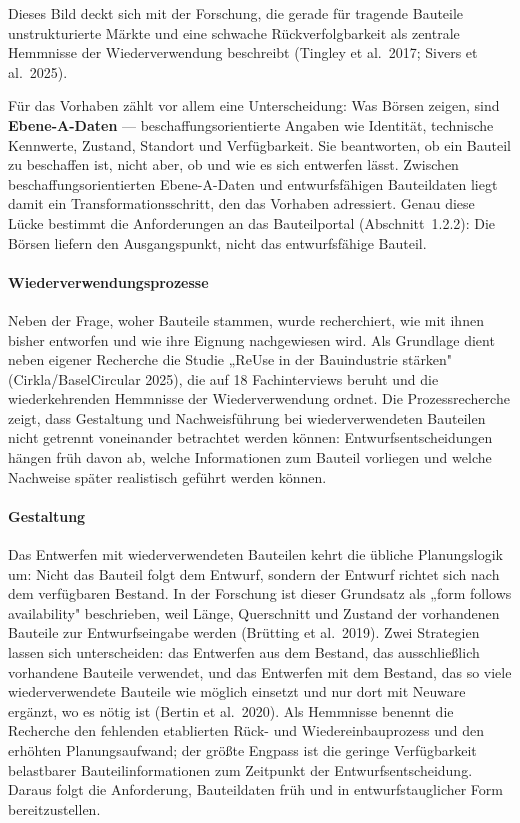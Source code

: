 \documentclass[type=zwischenbericht]{zukunftbau}
\begin{document}
\begin{SemioNest}
Dieses Bild deckt sich mit der Forschung, die gerade für tragende Bauteile unstrukturierte Märkte und eine schwache Rückverfolgbarkeit als zentrale Hemmnisse der Wiederverwendung beschreibt (Tingley et al.\ 2017; Sivers et al.\ 2025).

Für das Vorhaben zählt vor allem eine Unterscheidung: Was Börsen zeigen, sind \textbf{Ebene-A-Daten} --- beschaffungsorientierte Angaben wie Identität, technische Kennwerte, Zustand, Standort und Verfügbarkeit. Sie beantworten, ob ein Bauteil zu beschaffen ist, nicht aber, ob und wie es sich entwerfen lässt. Zwischen beschaffungsorientierten Ebene-A-Daten und entwurfsfähigen Bauteildaten liegt damit ein Transformationsschritt, den das Vorhaben adressiert. Genau diese Lücke bestimmt die Anforderungen an das Bauteilportal (Abschnitt~1.2.2): Die Börsen liefern den Ausgangspunkt, nicht das entwurfsfähige Bauteil.

\paragraph{Wiederverwendungsprozesse}
Neben der Frage, woher Bauteile stammen, wurde recherchiert, wie mit ihnen bisher entworfen und wie ihre Eignung nachgewiesen wird. Als Grundlage dient neben eigener Recherche die Studie „ReUse in der Bauindustrie stärken" (Cirkla/BaselCircular 2025), die auf 18 Fachinterviews beruht und die wiederkehrenden Hemmnisse der Wiederverwendung ordnet. Die Prozessrecherche zeigt, dass Gestaltung und Nachweisführung bei wiederverwendeten Bauteilen nicht getrennt voneinander betrachtet werden können: Entwurfsentscheidungen hängen früh davon ab, welche Informationen zum Bauteil vorliegen und welche Nachweise später realistisch geführt werden können.

\begin{SemioNest}
\paragraph{Gestaltung}
Das Entwerfen mit wiederverwendeten Bauteilen kehrt die übliche Planungslogik um: Nicht das Bauteil folgt dem Entwurf, sondern der Entwurf richtet sich nach dem verfügbaren Bestand. In der Forschung ist dieser Grundsatz als „form follows availability" beschrieben, weil Länge, Querschnitt und Zustand der vorhandenen Bauteile zur Entwurfseingabe werden (Brütting et al.\ 2019). Zwei Strategien lassen sich unterscheiden: das Entwerfen aus dem Bestand, das ausschließlich vorhandene Bauteile verwendet, und das Entwerfen mit dem Bestand, das so viele wiederverwendete Bauteile wie möglich einsetzt und nur dort mit Neuware ergänzt, wo es nötig ist (Bertin et al.\ 2020). Als Hemmnisse benennt die Recherche den fehlenden etablierten Rück- und Wiedereinbauprozess und den erhöhten Planungsaufwand; der größte Engpass ist die geringe Verfügbarkeit belastbarer Bauteilinformationen zum Zeitpunkt der Entwurfsentscheidung. Daraus folgt die Anforderung, Bauteildaten früh und in entwurfstauglicher Form bereitzustellen.


\end{SemioNest}
\end{SemioNest}
\end{document}
